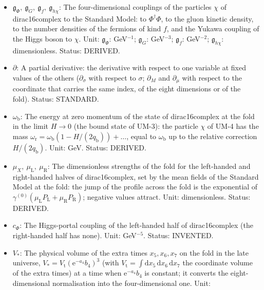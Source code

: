 \documentclass[
  10pt,
]{article}
\providecommand{\tightlist}{%
  \setlength{\itemsep}{0pt}\setlength{\parskip}{0pt}}
\begin{document}
\begin{itemize}
\tightlist
\item
  \(\mathfrak{g}_{\Phi},\ \mathfrak{g}_{G},\ \mathfrak{g}_{f},\ \mathfrak{g}_{h\chi}\):
  The four-dimensional couplings of the particles \(\chi\) of
  dirac16complex to the Standard Model: to \(\Phi^\dagger\Phi\), to the
  gluon kinetic density, to the number densities of the fermions of kind
  \(f\), and the Yukawa coupling of the Higgs boson to \(\chi\). Unit:
  \(\mathfrak{g}_{\Phi}\): GeV\(^{-1}\); \(\mathfrak{g}_{G}\):
  GeV\(^{-3}\); \(\mathfrak{g}_{f}\): GeV\(^{-2}\);
  \(\mathfrak{g}_{h\chi}\): dimensionless. Status: DERIVED.
\item
  \(\partial\): A partial derivative: the derivative with respect to one
  variable at fixed values of the others (\(\partial_\sigma\) with
  respect to \(\sigma\); \(\partial_M\) and \(\partial_\mu\) with
  respect to the coordinate that carries the same index, of the eight
  dimensions or of the fold). Status: STANDARD.
\item
  \(\omega_{\mathrm{b}}\): The energy at zero momentum of the state of
  dirac16complex at the fold in the limit \(H \to 0\) (the bound state
  of UM-3): the particle \(\chi\) of UM-4 has the mass
  \(\omega_{\mathrm{r}} = \omega_{\mathrm{b}}(1 - H/(2q_{\mathrm{b}})) + \dots\),
  equal to \(\omega_{\mathrm{b}}\) up to the relative correction
  \(H/(2q_{\mathrm{b}})\). Unit: GeV. Status: DERIVED.
\item
  \(\mu_X,\ \mu_{\mathrm{L}},\ \mu_{\mathrm{R}}\): The dimensionless
  strengths of the fold for the left-handed and right-handed halves of
  dirac16complex, set by the mean fields of the Standard Model at the
  fold: the jump of the profile across the fold is the exponential of
  \(\gamma^{(0)}(\mu_{\mathrm{L}}P_{\mathrm{L}} + \mu_{\mathrm{R}}P_{\mathrm{R}})\);
  negative values attract. Unit: dimensionless. Status: DERIVED.
\item
  \(c_\Phi\): The Higgs-portal coupling of the left-handed half of
  dirac16complex (the right-handed half has none). Unit: GeV\(^{-5}\).
  Status: INVENTED.
\item
  \(V_*\): The physical volume of the extra times \(x_5, x_6, x_7\) on
  the fold in the late universe,
  \(V_* = V_{\mathrm{t}}(\mathrm{e}^{-a_4}b_4)^3\) (with
  \(V_{\mathrm{t}} = \int\mathrm{d}x_5\,\mathrm{d}x_6\,\mathrm{d}x_7\)
  the coordinate volume of the extra times) at a time when
  \(\mathrm{e}^{-a_4}b_4\) is constant; it converts the
  eight-dimensional normalisation into the four-dimensional one. Unit:

\end{itemize}
\end{document}
